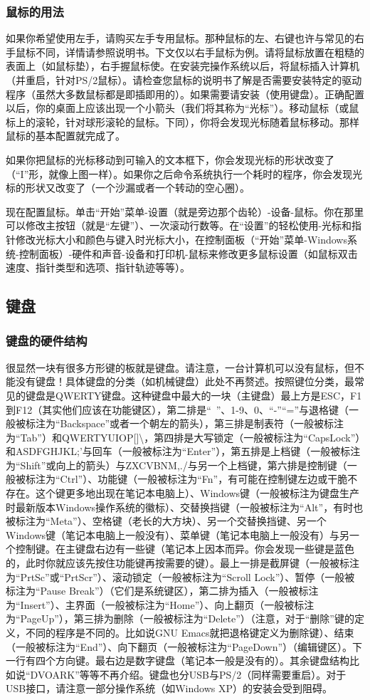 \subsubsection{鼠标的用法}
如果你希望使用左手，请购买左手专用鼠标。那种鼠标的左、右键也许与常见的右手鼠标不同，详情请参照说明书。下文仅以右手鼠标为例。请将鼠标放置在粗糙的表面上（如鼠标垫），右手握鼠标使。在安装完操作系统以后，将鼠标插入计算机（并重启，针对PS/2鼠标）。请检查您鼠标的说明书了解是否需要安装特定的驱动程序（虽然大多数鼠标都是即插即用的）。如果需要请安装（使用键盘）。正确配置以后，你的桌面上应该出现一个小箭头（我们将其称为“光标”）。移动鼠标（或鼠标上的滚轮，针对球形滚轮的鼠标。下同），你将会发现光标随着鼠标移动。那样鼠标的基本配置就完成了。\par
如果你把鼠标的光标移动到可输入的文本框下，你会发现光标的形状改变了（“I”形，就像上图一样）。如果你之后命令系统执行一个耗时的程序，你会发现光标的形状又改变了（一个沙漏或者一个转动的空心圈）。\par
现在配置鼠标。单击“开始”菜单-设置（就是旁边那个齿轮）-设备-鼠标。你在那里可以修改主按钮（就是“左键”）、一次滚动行数等。在“设置”的轻松使用-光标和指针修改光标大小和颜色与键入时光标大小，在控制面板（“开始”菜单-Windows系统-控制面板）-硬件和声音-设备和打印机-鼠标来修改更多鼠标设置（如鼠标双击速度、指针类型和选项、指针轨迹等等）。
\subsection{键盘}
\subsubsection{键盘的硬件结构}
很显然一块有很多方形键的板就是键盘。请注意，一台计算机可以没有鼠标，但不能没有键盘！具体键盘的分类（如机械键盘）此处不再赘述。按照键位分类，最常见的键盘是QWERTY键盘。这种键盘中最大的一块（主键盘）最上方是ESC，F1到F12（其实他们应该在功能键区），第二排是“~”、1-9、0、“-”“=”与退格键（一般被标注为“Backspace”或者一个朝左的箭头），第三排是制表符（一般被标注为“Tab”）和QWERTYUIOP[]\textbackslash，第四排是大写锁定（一般被标注为“CapsLock”）和ASDFGHJKL;'与回车（一般被标注为“Enter”），第五排是上档键（一般被标注为“Shift”或向上的箭头）与ZXCVBNM,./与另一个上档键，第六排是控制键（一般被标注为“Ctrl”）、功能键（一般被标注为“Fn”，有可能在控制键左边或干脆不存在。这个键更多地出现在笔记本电脑上）、Windows键（一般被标注为键盘生产时最新版本Windows操作系统的徽标）、交替换挡键（一般被标注为“Alt”，有时也被标注为“Meta”）、空格键（老长的大方块）、另一个交替换挡键、另一个Windows键（笔记本电脑上一般没有）、菜单键（笔记本电脑上一般没有）与另一个控制键。在主键盘右边有一些键（笔记本上因本而异。你会发现一些键是蓝色的，此时你就应该先按住功能键再按需要的键）。最上一排是截屏键（一般被标注为“PrtSc”或“PrtScr”）、滚动锁定（一般被标注为“Scroll Lock”）、暂停（一般被标注为“Pause Break”）（它们是系统键区），第二排为插入（一般被标注为“Insert”）、主界面（一般被标注为“Home”）、向上翻页（一般被标注为“PageUp”），第三排为删除（一般被标注为“Delete”）（注意，对于“删除”键的定义，不同的程序是不同的。比如说GNU Emacs就把退格键定义为删除键）、结束（一般被标注为“End”）、向下翻页（一般被标注为“PageDown”）（编辑键区）。下一行有四个方向键。最右边是数字键盘（笔记本一般是没有的）。其余键盘结构比如说“DVOARK”等等不再介绍。键盘也分USB与PS/2（同样需要重启）。对于USB接口，请注意一部分操作系统（如Windows XP）的安装会受到阻碍。
